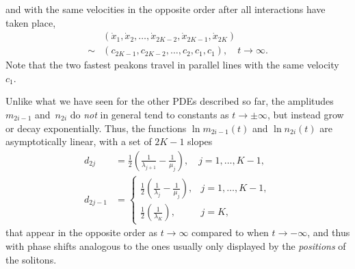 \documentclass[10pt,a4paper]{article} \pdfoutput=1 
\begin{document}
and with the same velocities in the opposite order after all interactions have taken place,
\begin{equation}
  \begin{split}
    &
    (\dot x_1, \dot x_2, \dots, \dot x_{2K-2}, \dot x_{2K-1}, \dot x_{2K})
    \\
    \sim
    &
    (c_{2K-1}, c_{2K-2}, \dots, c_2, c_1, c_1)
    , \quad
    t \to \infty
    .
  \end{split}
\end{equation}
Note that the two fastest peakons travel in parallel lines with the same velocity~$c_1$.

Unlike what we have seen for the other PDEs described so far,
the amplitudes $m_{2i-1}$ and~$n_{2i}$ do \emph{not} in general
tend to constants as $t \to \pm\infty$,
but instead grow or decay exponentially.
Thus, the functions $\ln m_{2i-1}(t)$ and $\ln n_{2i}(t)$ are asymptotically linear,
with a set of $2K-1$ slopes
\begin{equation}
  \label{eq:asymptotic-amplitude-slopes}
  \begin{aligned}
    d_{2j}
    &=
    \frac12 \left( \frac{1}{\lambda_{j+1}} - \frac{1}{\mu_{j}} \right)
    ,\quad
    j = 1, \dots, K-1
    ,\\[1.5ex]
    d_{2j-1}
    &=
    \begin{cases}
      \displaystyle
      \frac12 \left( \frac{1}{\lambda_{j}} - \frac{1}{\mu_{j}} \right)
      ,&
      j = 1, \dots, K-1
      ,\\[2ex] \displaystyle
      \frac12 \left( \frac{1}{\lambda_{K}} \right)
      ,&
      j = K
      ,
    \end{cases}
  \end{aligned}
\end{equation}
that appear in the opposite order as $t \to \infty$ compared to when $t \to -\infty$,
and thus with phase shifts analogous to the ones usually only displayed by the \emph{positions}
of the solitons.
\end{document}
